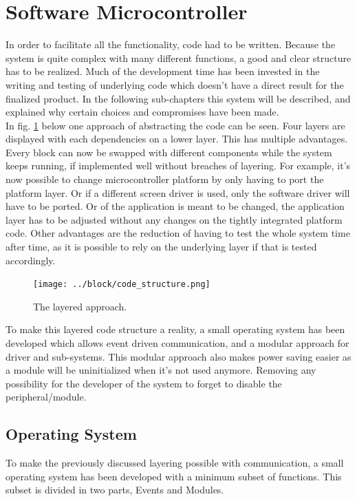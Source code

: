 \section{Software Microcontroller}
\label{sec:software}
In order to facilitate all the functionality, code had to be written. Because the system is quite complex with many different functions, a good and clear structure has to be realized. Much of the development time has been invested in the writing and testing of underlying code which doesn’t have a direct result for the finalized product. In the following sub-chapters this system will be described, and explained why certain choices and compromises have been made.\\
In fig. \ref{fig:code_structure} below one approach of abstracting the code can be seen. Four layers are displayed with each dependencies on a lower layer. This has multiple advantages. Every block can now be swapped with different components while the system keeps running, if implemented well without breaches of layering.\newpar
For example, it's now possible to change microcontroller platform by only having to port the platform layer. Or if a different screen driver is used, only the software driver will have to be ported. Or of the application is meant to be changed, the application layer  has to be adjusted without any changes on the tightly integrated platform code. Other advantages are the reduction of having to test the whole system time after time, as it is possible to rely on the underlying layer if that is tested accordingly.\\

\begin{figure}[H]
	\centering
	\label{fig:code_structure}
	\texttt{[image: ../block/code\_structure.png]}
	\caption{The layered approach.}
\end{figure}
To make this layered code structure a reality, a small operating system has been developed which allows event driven communication, and a modular approach for driver and sub-systems. This modular approach also makes power saving easier as a module will be uninitialized when it's not used anymore. Removing any possibility for the developer of the system to forget to disable the peripheral/module.\newpar

\subsection{Operating System}
To make the previously discussed layering possible with communication, a small operating system has been developed with a minimum subset of functions. This subset is divided in two parts, Events and Modules.
